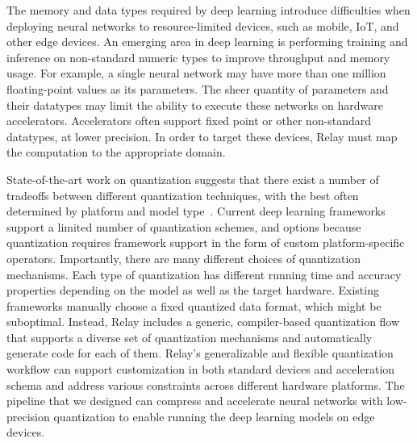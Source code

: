 The memory and data types required by deep learning introduce
difficulties when deploying neural networks to resource-limited devices,
such as mobile, IoT, and other edge devices.
An emerging area in deep learning is performing training and inference on
  non-standard numeric types to improve throughput and memory usage.
For example, a single neural network may have more than one million floating-point values
  as its parameters.
The sheer quantity of parameters and their datatypes may limit the ability
  to execute these networks on hardware accelerators.
Accelerators often support fixed point or other non-standard datatypes, at lower precision.
In order to target these devices, Relay must map the computation
  to the appropriate domain.

State-of-the-art work on quantization suggests that there exist a number of tradeoffs
  between different quantization techniques,
  with the best often determined by platform and model type~\citep{krishnamoorthi18}.
Current deep learning frameworks support a limited number of quantization schemes, and options
  because quantization requires framework support in the form of custom platform-specific operators.
Importantly, there are many different choices of quantization mechanisms.
Each type of quantization has different running time and accuracy properties depending
  on the model as well as the target hardware.
Existing frameworks manually choose a fixed quantized data format, which might be
  suboptimal.
Instead, Relay includes a generic, compiler-based quantization flow that supports a diverse set
  of quantization mechanisms and automatically generate code for each of them.
Relay's generalizable and flexible quantization workflow
  can support customization in both standard devices and acceleration schema
  and address various constraints across different hardware platforms.
The pipeline that we designed can compress and accelerate neural networks with
  low-precision quantization to enable running the deep learning models on edge devices.

%

